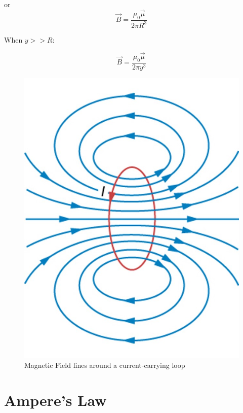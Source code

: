 \documentclass[14pt]{memoir}
\begin{document}
or
\begin{equation}
\vec{B} = \frac{\mu_0 \vec{\mu}}{2 \pi R^3}
\end{equation}


When $y >> R$:

\begin{equation}
\vec{B} = \frac{\mu_0 \vec{\mu}}{2 \pi y^3}
\end{equation}

\begin{figure}[H]
\begin{center}
\includegraphics[scale=0.4]{fig/fig_12_12.jpg}
\caption{Magnetic Field lines around a current-carrying loop}
\label{fig:12_12}
\end{center}
\end{figure}

\section{Ampere's Law}
\end{document}
